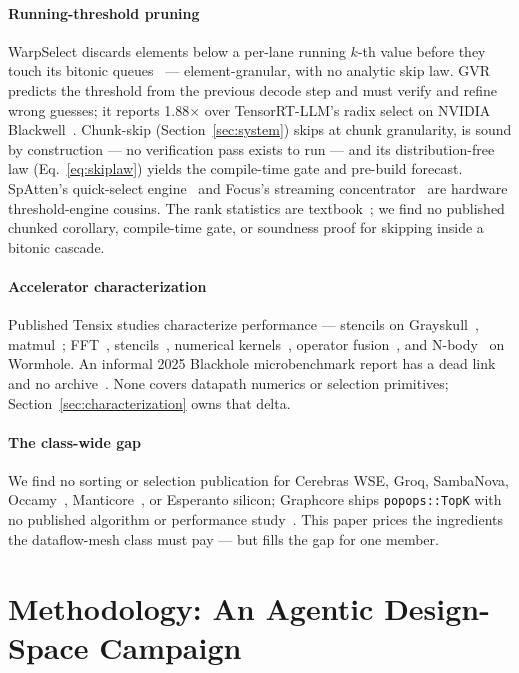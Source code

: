 \paragraph{Running-threshold pruning}
WarpSelect discards elements below a per-lane running $k$-th value before
they touch its bitonic queues~\cite{johnson2019billion} ---
element-granular, with no analytic skip law. GVR predicts the threshold
from the previous decode step and must verify and refine wrong guesses;
it reports 1.88$\times$ over TensorRT-LLM's radix select on NVIDIA
Blackwell~\cite{gvr2026}. Chunk-skip (Section~\ref{sec:system}) skips at
chunk granularity, is sound by construction --- no verification pass
exists to run --- and its distribution-free law (Eq.~\ref{eq:skiplaw})
yields the compile-time gate and pre-build forecast. SpAtten's
quick-select engine~\cite{wang2021spatten} and Focus's streaming
concentrator~\cite{focus2025} are hardware threshold-engine cousins. The rank statistics are
textbook~\cite{knuth1998taocp3}; we find no published chunked
corollary, compile-time gate, or soundness proof for skipping inside a
bitonic cascade.

\paragraph{Accelerator characterization}
Published Tensix studies characterize performance --- stencils on
Grayskull~\cite{brown2024grayskull}, matmul~\cite{matmul2025tenstorrent};
FFT~\cite{brown2025fft}, stencils~\cite{stencil2026wormhole}, numerical
kernels~\cite{numkernels2026wormhole}, operator
fusion~\cite{fusion2026tensix}, and N-body~\cite{amati2025nbody} on
Wormhole. An informal 2025 Blackhole microbenchmark report has a dead link and
no archive~\cite{blackholemicrobench2025}. None covers datapath numerics or selection
primitives; Section~\ref{sec:characterization} owns that delta.

\paragraph{The class-wide gap}
We find no sorting or selection publication for Cerebras WSE, Groq,
SambaNova, Occamy~\cite{occamy2025}, Manticore~\cite{zaruba2021manticore},
or Esperanto silicon; Graphcore ships \texttt{popops::TopK} with no
published algorithm or performance study~\cite{poplar_topk}. This paper prices the
ingredients the dataflow-mesh class must pay --- but fills the gap for
one member.

\section{Methodology: An Agentic Design-Space Campaign}
\label{sec:methodology}

